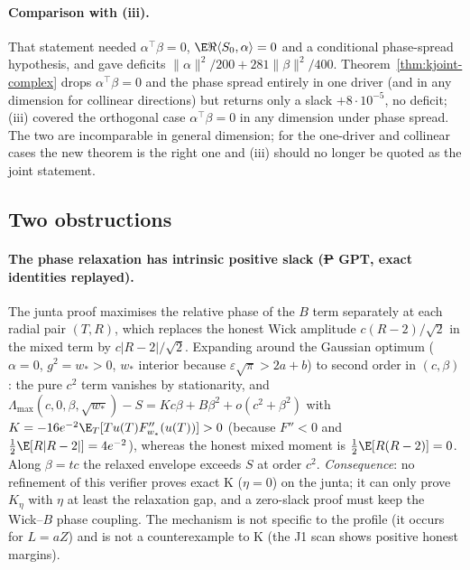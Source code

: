 \paragraph{Comparison with  (iii).} That statement needed $\alpha^{\top}\beta=0$, $\E\Re\langle S_0,\alpha\rangle=0$ and a conditional phase-spread hypothesis, and
gave deficits $\|\alpha\|^2/200+281\|\beta\|^2/400$. Theorem~\ref{thm:kjoint-complex} drops $\alpha^{\top}\beta=0$ and the phase spread entirely in one driver (and in any dimension for
collinear directions) but returns only a slack $+8\cdot10^{-5}$, no deficit; (iii) covered the orthogonal case $\alpha^{\top}\beta=0$ in any dimension under phase spread. The two
are incomparable in general dimension; for the one-driver and collinear cases the new theorem is the right one and (iii) should no longer be quoted as the joint statement.

\subsection{Two obstructions}\label{sec:kjoint-obstr}
\paragraph{The phase relaxation has intrinsic positive slack (\st{P} GPT, exact identities replayed).} The junta proof maximises the relative phase of the $B$ term separately at
each radial pair $(T,R)$, which replaces the honest Wick amplitude $c(R-2)/\sqrt2$ in the mixed term by $c|R-2|/\sqrt2$. Expanding around the Gaussian optimum ($\alpha=0$,
$g^2=w_*>0$, $w_*$ interior because $\varepsilon\sqrt\pi>2a+b$) to second order in $(c,\beta)$: the pure $c^2$ term vanishes by stationarity, and
$\Lambda_{\max}(c,0,\beta,\sqrt{w_*})-S=Kc\beta+B\beta^2+o(c^2+\beta^2)$ with $K=-16e^{-2}\E_T[Tu(T)F''_{w_*}(u(T))]>0$ (because $F''<0$ and $\frac12\E[R|R-2|]=4e^{-2}$),
whereas the honest mixed moment is $\frac12\E[R(R-2)]=0$. Along $\beta=tc$ the relaxed envelope exceeds $S$ at order $c^2$. \emph{Consequence}: no refinement of this verifier
proves exact K ($\eta=0$) on the junta; it can only prove $K_\eta$ with $\eta$ at least the relaxation gap, and a zero-slack proof must keep the Wick--$B$ phase coupling. The
mechanism is not specific to the profile (it occurs for $L=aZ$) and is not a counterexample to K (the J1 scan shows positive honest margins).

